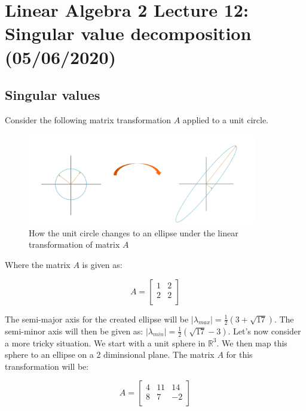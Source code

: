 \documentclass[11pt, a4paper]{article}
\newcommand*{\R}{\ensuremath{\mathbb{R}}}
\begin{document}
\setcounter{section}{11}
\setcounter{equation}{0}

\section{Linear Algebra 2 Lecture 12: Singular value decomposition (05/06/2020)}



\subsection{Singular values}
Consider the following matrix transformation $A$ applied to  a unit circle.

\begin{figure}[H]
  \centerline{\includegraphics[width=100mm]{images/Transformation.png}}
  \caption{How the unit circle changes to an ellipse under the linear transformation of matrix $A$}
\end{figure}

Where the matrix $A$ is given as:

\begin{equation}
	A = 
	\begin{bmatrix}
		1 & 2\\
		2 & 2\\
	\end{bmatrix}
\end{equation}

The semi-major axis for the created ellipse will be $|\lambda_{max}| = \frac{1}{2}(3 + \sqrt{17})$. The semi-minor axis will then be given as: $|\lambda_{min}| = \frac{1}{2}(\sqrt{17} - 3)$. Let's now consider a more tricky situation. We start with a unit sphere in $\R^3$. We then map this sphere to an ellipse on a 2 diminsional plane. The matrix $A$ for this transformation will be:

\begin{equation}
	A =
	\begin{bmatrix}
		4 & 11 & 14\\
		8 & 7 & -2\\
	\end{bmatrix}
\end{equation}
\end{document}
